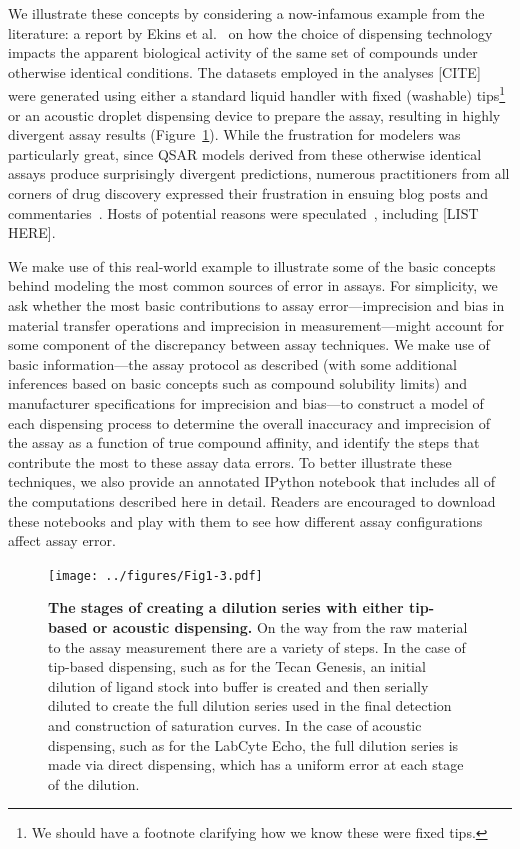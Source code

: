 \documentclass[aps,pre,twocolumn,nofootinbib,superscriptaddress,linenumbers]{revtex4-1}
\begin{document}
We illustrate these concepts by considering a now-infamous example from the literature: a report by Ekins et al.~\cite{ekins_dispensing_2013} on how the choice of dispensing technology impacts the apparent biological activity of the same set of compounds under otherwise identical conditions.
The datasets employed in the analyses {\color{red}[CITE]} were generated using either a standard liquid handler with fixed (washable) tips\footnote{{\color{red}We should have a footnote clarifying how we know these were fixed tips.}} or an acoustic droplet dispensing device to prepare the assay, resulting in highly divergent assay results (Figure~\ref{fig:overview}).
While the frustration for modelers was particularly great, since QSAR models derived from these otherwise identical assays produce surprisingly divergent predictions, numerous practitioners from all corners of drug discovery expressed their frustration in ensuing blog posts and commentaries~\cite{in-the-pipeline-comments}.
Hosts of potential reasons were speculated~\cite{in-the-pipeline-comments}, including [LIST HERE].

We make use of this real-world example to illustrate some of the basic concepts behind modeling the most common sources of error in assays.
For simplicity, we ask whether the most basic contributions to assay error---imprecision and bias in material transfer operations and imprecision in measurement---might account for some component of the discrepancy between assay techniques.
We make use of basic information---the assay protocol as described (with some additional inferences based on basic concepts such as compound solubility limits) and manufacturer specifications for imprecision and bias---to construct a model of each dispensing process to determine the overall inaccuracy and imprecision of the assay as a function of true compound affinity, and identify the steps that contribute the most to these assay data errors.
To better illustrate these techniques, we also provide an annotated IPython notebook that includes all of the computations described here in detail.
Readers are encouraged to download these notebooks and play with them to see how different assay configurations affect assay error.

\begin{figure}[tb]
   \texttt{[image: ../figures/Fig1-3.pdf]}
  \caption{{\bf The stages of creating a dilution series with either tip-based or acoustic dispensing.}
  On the way from the raw material to the assay measurement there are a variety of steps. 
  In the case of tip-based dispensing, such as for the Tecan Genesis, an initial dilution of ligand stock into buffer is created and then serially diluted to create the full dilution series used in the final detection and construction of saturation curves. 
  In the case of acoustic dispensing, such as for the LabCyte Echo, the full dilution series is made via direct dispensing, which has a uniform error at each stage of the dilution.
  }
  \label{fig:overview}
\end{figure}
\end{document}
